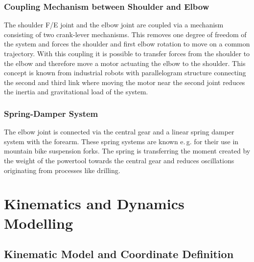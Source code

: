 \documentclass[letterpaper, 10 pt, conference]{ieeeconf}  %
\begin{document}
\subsubsection{Coupling Mechanism between Shoulder and Elbow}

The shoulder F/E joint and the elbow joint are coupled via a mechanism consisting of two crank-lever mechanisms.
This removes one degree of freedom of the system and forces the shoulder and first elbow rotation to move on a common trajectory.
With this coupling it is possible to transfer forces from the shoulder to the elbow and therefore move a motor actuating the elbow to the shoulder.
This concept is known from industrial robots with parallelogram structure connecting the second and third link where moving the motor near the second joint reduces the inertia and gravitational load of the system.

\subsubsection{Spring-Damper System}

The elbow joint is connected via the central gear and a linear spring damper system with the forearm.
These spring systems are known e.\,g. for their use in mountain bike suspension forks.
The spring is transferring the moment created by the weight of the powertool towards the central gear and reduces oscillations originating from processes like drilling.

\section{Kinematics and Dynamics Modelling}
\label{sec:model}

\subsection{Kinematic Model and Coordinate Definition}
\end{document}
